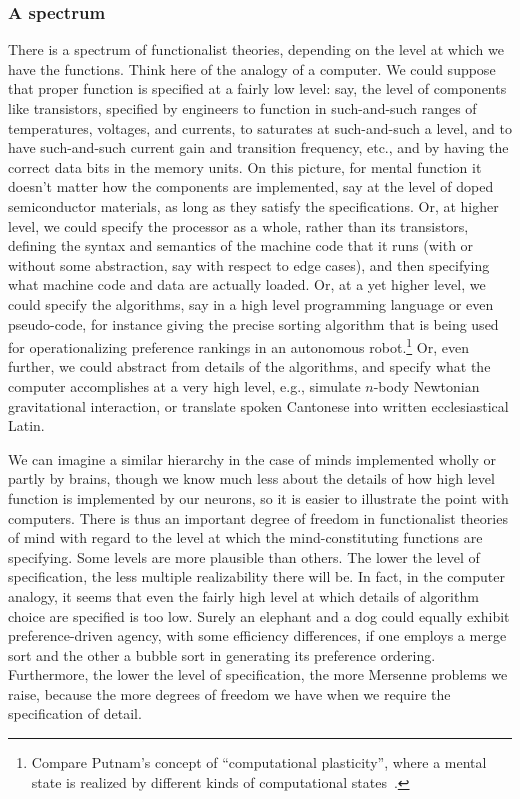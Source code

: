 \subsubsection{A spectrum}
There is a spectrum of functionalist theories, depending on the level at which we have the functions. Think here of the analogy of a computer. 
We could suppose that proper function is specified at a fairly low
level: say, the level of  components like transistors, specified by engineers to 
function in such-and-such ranges of temperatures, voltages, and currents, to saturates at such-and-such a level, 
and to have such-and-such current gain and transition frequency, etc., and by having the correct data bits in 
the memory units. On this picture, for mental function
it doesn't matter how the components are implemented, say at the level of doped semiconductor materials, as long
as they satisfy the specifications. Or, at 
higher level, we could specify the processor as a whole, rather than its transistors, defining the syntax and semantics of the 
machine code that it runs (with or without some abstraction, say with respect to edge cases), and then specifying what machine 
code and data are actually loaded. Or, at a yet higher level, we could specify the algorithms, say in a high level 
programming language or even pseudo-code, for instance giving the precise sorting algorithm that is being used for 
operationalizing preference rankings in an autonomous robot.\footnote{Compare 
Putnam's concept of ``computational plasticity'', where a mental state is realized by different
kinds of computational states~\parencite[p.~xiv]{Putnam1988}.}
 Or, even further, we could abstract from details of the algorithms, and specify 
what the computer accomplishes at a very high level, e.g., simulate $n$-body Newtonian gravitational interaction, or 
translate spoken Cantonese into written ecclesiastical Latin.

We can imagine a similar hierarchy in the case of minds
implemented wholly or partly by brains, though we know much less about the details of how high level function is implemented
by our neurons, so it is easier to illustrate the point with computers.
There is thus an important degree of freedom in functionalist theories of mind with regard to the level at which the 
mind-constituting functions are specifying. Some levels are more plausible than others. The lower the level of specification,
the less multiple realizability there will be. In fact, in the computer analogy, it seems that even the fairly high level
at which details of algorithm choice are specified is too low. Surely an elephant and a dog could equally exhibit preference-driven
agency, with some efficiency differences, if one employs a merge sort and the other a bubble sort in generating its preference 
ordering. Furthermore, the lower the level of specification, the more Mersenne problems we raise, because the more degrees of 
freedom we have when we require the specification of detail.


